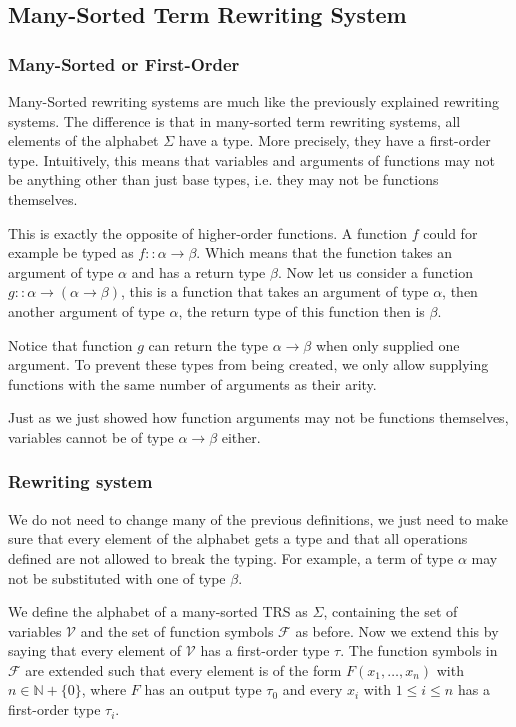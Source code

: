 \subsection{Many-Sorted Term Rewriting System}
\subsubsection{Many-Sorted or First-Order}
Many-Sorted rewriting systems are much like the previously explained rewriting systems. The difference is that in many-sorted term rewriting systems, all elements of the alphabet $\Sigma$ have a type. More precisely, they have a first-order type. Intuitively, this means that variables and arguments of functions may not be anything other than just base types, i.e. they may not be functions themselves. 

This is exactly the opposite of higher-order functions. A function $f$ could for example be typed as $f :: \alpha \rightarrow \beta$. Which means that the function takes an argument of type $\alpha$ and has a return type $\beta$. Now let us consider a function $g :: \alpha \rightarrow (\alpha \rightarrow \beta)$, this is a function that takes an argument of type $\alpha$, then another argument of type $\alpha$, the return type of this function then is $\beta$. 

Notice that function $g$ can return the type $\alpha \rightarrow \beta$ when only supplied one argument. To prevent these types from being created, we only allow supplying functions with the same number of arguments as their arity.

Just as we just showed how function arguments may not be functions themselves, variables cannot be of type $\alpha \rightarrow \beta$ either.
\subsubsection{Rewriting system}
We do not need to change many of the previous definitions, we just need to make sure that every element of the alphabet gets a type and that all operations defined are not allowed to break the typing. For example, a term of type $\alpha$ may not be substituted with one of type $\beta$.

We define the alphabet of a many-sorted TRS as $\Sigma$, containing the set of variables $\mathcal{V}$ and the set of function symbols $\mathcal{F}$ as before. Now we extend this by saying that every element of $\mathcal{V}$ has a first-order type $\tau$. The function symbols in $\mathcal{F}$ are extended such that every element is of the form $F(x_1, \dots, x_n)$ with $n \in \mathbb{N} + \{0\}$, where $F$ has an output type $\tau_0$ and every $x_i$ with $1 \leq i \leq n$ has a first-order type $\tau_i$. 

